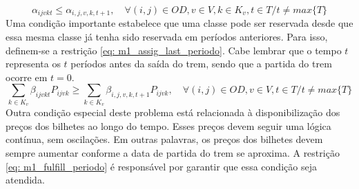 \begin{equation}
	\alpha_{ijvkt} \leq \alpha_{i,j,v,k,t+1}, \quad   \forall(i,j) \in OD, v \in V, k \in K_v, t \in T/ t \neq max\{T\}     \label{eq: m1_assig_last_periodo}
\end{equation}
Uma condição importante estabelece que uma classe pode ser reservada desde que essa mesma classe já tenha sido reservada em períodos anteriores. Para isso, definem-se a restrição \eqref{eq: m1_assig_last_periodo}. Cabe lembrar que o tempo $t$ representa os $t$ períodos antes da saída do trem, sendo que a partida do trem ocorre em $t = 0$.
\begin{equation}
	\sum_{k \in K_v}\beta_{ijvkt}P_{ijvk} \geq \sum_{k \in K_v}\beta_{i,j,v,k,t+1}P_{ijvk},  \quad   \forall(i,j) \in OD, v \in V, t \in T/ t \neq max\{T\}   \label{eq: m1_fulfill_periodo}
\end{equation}
Outra condição especial deste problema está relacionada à disponibilização dos preços dos bilhetes ao longo do tempo. Esses preços devem seguir uma lógica contínua, sem oscilações. Em outras palavras, os preços dos bilhetes devem sempre aumentar conforme a data de partida do trem se aproxima. A restrição \eqref{eq: m1_fulfill_periodo} é responsável por garantir que essa condição seja atendida.

